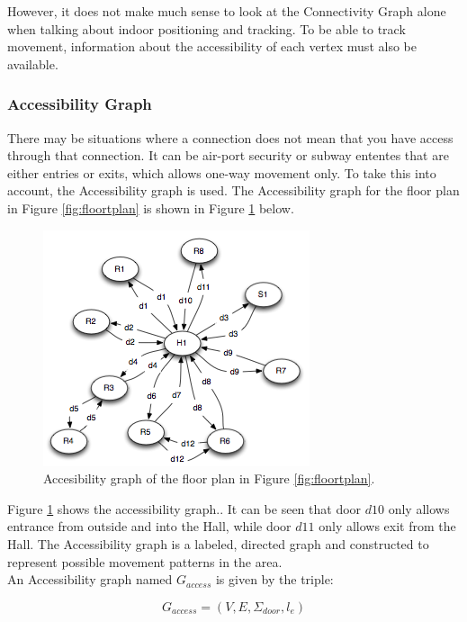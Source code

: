However, it does not make much sense to look at the Connectivity Graph alone when talking about indoor positioning and tracking. 
To be able to track movement, information about the accessibility of each vertex must also be available. 

\subsubsection{ \quad Accessibility Graph}
There may be situations where a connection does not mean that you have access through that connection.
It can be air-port security or subway ententes that are either entries or exits, which allows one-way movement only.
To take this into account, the Accessibility graph is used. 
The Accessibility graph for the floor plan in Figure \ref{fig:floortplan} is shown in Figure \ref{fig:accesibbilitygraph} below.

\begin{figure}[H]%
\includegraphics{images/accessibilitygraph.png}%
\caption{Accesibility graph of the floor plan in Figure \ref{fig:floortplan}.} %
\label{fig:accesibbilitygraph}%
\end{figure}%

Figure \ref{fig:accesibbilitygraph} shows the accessibility graph..
It can be seen that door $d10$ only allows entrance from outside and into the Hall, while door $d11$ only allows exit from the Hall.
The Accessibility graph is a labeled, directed graph and constructed to represent possible movement patterns in the area. \\

An Accessibility graph named $G_{access}$ is given by the triple: 

\begin{equation}
G_{access} = (V, E, \Sigma_{door}, l_e)
\end{equation} 

